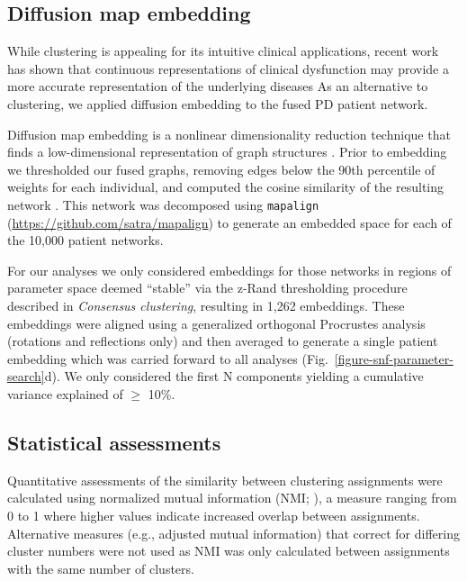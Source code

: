 \documentclass[12pt,aps,pra,reprint,showkeys]{revtex4-1}
\begin{document}
\subsection*{Diffusion map embedding}

While clustering is appealing for its intuitive clinical applications, recent work has shown that continuous representations of clinical dysfunction may provide a more accurate representation of the underlying diseases \citep{xia2018linked, zeighami2017clinical}
As an alternative to clustering, we applied diffusion embedding to the fused PD patient network.

Diffusion map embedding is a nonlinear dimensionality reduction technique that finds a low-dimensional representation of graph structures \citep{coifman2005geometric, lafon2006diffusion}.
Prior to embedding we thresholded our fused graphs, removing edges below the 90th percentile of weights for each individual, and computed the cosine similarity of the resulting network \citep{margulies2016situating}.
This network was decomposed using \texttt{mapalign} (\url{https://github.com/satra/mapalign}) to generate an embedded space for each of the 10,000 patient networks.

For our analyses we only considered embeddings for those networks in regions of parameter space deemed ``stable'' via the z-Rand thresholding procedure described in \textit{Consensus clustering}, resulting in 1,262 embeddings.
These embeddings were aligned using a generalized orthogonal Procrustes analysis (rotations and reflections only) and then averaged to generate a single patient embedding which was carried forward to all analyses (Fig.~\ref{figure-snf-parameter-search}d).
We only considered the first N components yielding a cumulative variance explained of $\ge$ 10\%.

\subsection*{Statistical assessments}

Quantitative assessments of the similarity between clustering assignments were calculated using normalized mutual information (NMI; \citep{strehl2002cluster}), a measure ranging from 0 to 1 where higher values indicate increased overlap between assignments.
Alternative measures (e.g., adjusted mutual information) that correct for differing cluster numbers were not used as NMI was only calculated between assignments with the same number of clusters.
\end{document}
